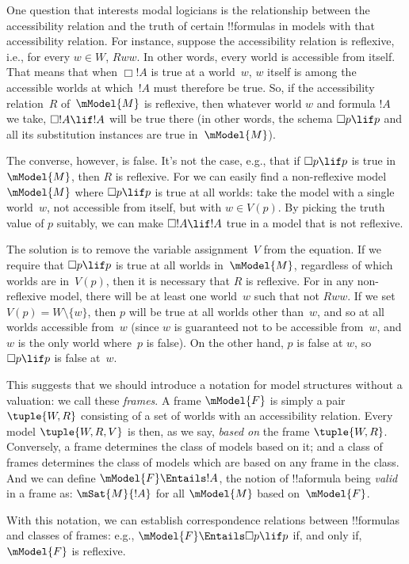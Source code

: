 \documentclass[../../../include/open-logic-section]{subfiles}
\begin{document}

One question that interests modal logicians is the relationship
between the accessibility relation and the truth of certain
!!{formula}s in models with that accessibility relation. For instance,
suppose the accessibility relation is reflexive, i.e., for every $w
\in W$, $Rww$. In other words, every world is accessible from
itself. That means that when $\Box !A$ is true at a world~$w$, $w$
itself is among the accessible worlds at which~$!A$ must therefore be
true. So, if the accessibility relation~$R$ of~$\mModel{M}$ is
reflexive, then whatever world $w$ and formula $!A$ we take, $\Box !A
\lif !A$ will be true there (in other words, the schema $\Box p \lif
p$ and all its substitution instances are true in~$\mModel{M}$).

The converse, however, is false. It's not the case, e.g., that if
$\Box p \lif p$ is true in~$\mModel{M}$, then $R$ is reflexive. For we
can easily find a non-reflexive model~$\mModel{M}$ where $\Box p \lif
p$ is true at all worlds: take the model with a single world~$w$, not
accessible from itself, but with $w \in V(p)$. By picking the truth
value of $p$ suitably, we can make $\Box !A \lif !A$ true in a model
that is not reflexive.

The solution is to remove the variable assignment~$V$ from the
equation. If we require that $\Box p \lif p$ is true at all worlds
in~$\mModel{M}$, regardless of which worlds are in~$V(p)$, then it is
necessary that $R$ is reflexive. For in any non-reflexive model, there
will be at least one world~$w$ such that not $Rww$. If we set $V(p) =
W \setminus \{w\}$, then $p$ will be true at all worlds other
than~$w$, and so at all worlds accessible from~$w$ (since $w$ is
guaranteed not to be accessible from~$w$, and $w$ is the only world
where~$p$ is false). On the other hand, $p$ is false at $w$, so $\Box
p \lif p$ is false at~$w$.

This suggests that we should introduce a notation for model structures
without a valuation: we call these \emph{frames}. A frame $\mModel{F}$
is simply a pair $\tuple{W, R}$ consisting of a set of worlds with an
accessibility relation. Every model $\tuple{W, R, V}$ is then, as we
say, \emph{based on} the frame $\tuple{W, R}$. Conversely, a frame
determines the class of models based on it; and a class of frames
determines the class of models which are based on any frame in the
class. And we can define $\mModel{F} \Entails !A$, the notion of !!a{formula}
being \emph{valid} in a frame as: $\mSat{M}{!A}$ for all $\mModel{M}$
based on~$\mModel{F}$.

With this notation, we can establish correspondence relations between
!!{formula}s and classes of frames: e.g., $\mModel{F} \Entails \Box p \lif p$
if, and only if, $\mModel{F}$ is reflexive.
\end{document}

